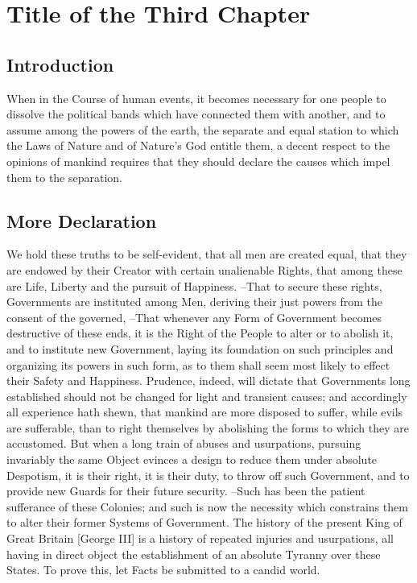 \chapter{Title of the Third Chapter}

\section{Introduction}
When in the Course of human events, it becomes necessary for one people  to dissolve the political bands which have connected them with another,  and to assume among the powers of the earth, the separate and equal station  to which the Laws of Nature and of Nature's God entitle them, a decent respect to the opinions of mankind requires that they should declare  the causes which impel them to the separation.

\section{More Declaration}

We hold these truths to be self-evident, that all men are created equal,  that they are endowed by their Creator with certain unalienable Rights,  that among these are Life, Liberty and the pursuit of Happiness. --That to secure these  rights, Governments are instituted among Men, deriving their just powers  from the consent of the governed, --That whenever any Form of Government  becomes destructive of these ends, it is the Right of the People to alter  or to abolish it, and to institute new Government, laying its foundation on  such principles and organizing its powers in such form, as to them shall  seem most likely to effect their Safety and Happiness. Prudence, indeed, will dictate that Governments long established should not  be changed for light and transient causes; and accordingly all experience  hath shewn, that mankind are more disposed to suffer, while evils are  sufferable, than to right themselves by abolishing the forms to which they  are accustomed. But when a long train of abuses and usurpations, pursuing invariably the same  Object evinces a design to reduce them under absolute Despotism, it is their  right, it is their duty, to throw off such Government, and to provide new Guards for their future security. --Such has been the patient sufferance of these Colonies; and such is now the  necessity which constrains them to alter their former Systems of Government.  The history of the present King of Great Britain [George III] is a history  of repeated injuries and usurpations, all having in direct object the  establishment of an absolute Tyranny over these States. To prove this, let Facts be submitted to a candid world.